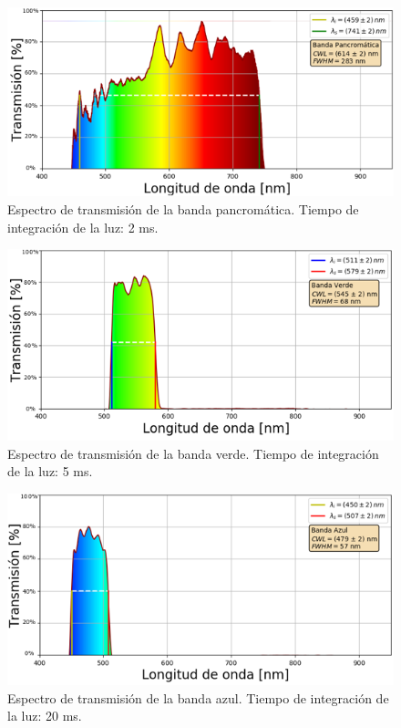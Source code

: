 \begin{figure}[H]
	\centering
	\includegraphics[scale=1.25]{Figs/microespectrometro/espectro_pancromaticat.png}
	\caption{Espectro de transmisión de la banda pancromática. Tiempo de integración de la luz: 2 ms.}
	\label{fig:bpanc}
\end{figure}
\begin{figure}[H]
	\centering
	\includegraphics[scale=0.6]{Figs/microespectrometro/espectro_verdet.png}
	\caption{Espectro de transmisión de la banda verde. Tiempo de integración de la luz: 5 ms.}
	\label{fig:bverde}
\end{figure}
\begin{figure}[H]
	\centering
	\includegraphics[scale=0.6]{Figs/microespectrometro/espectro_azult.png}
	\caption{Espectro de transmisión de la banda azul. Tiempo de integración de la luz: 20 ms.}
	\label{fig:bazul}
\end{figure}

